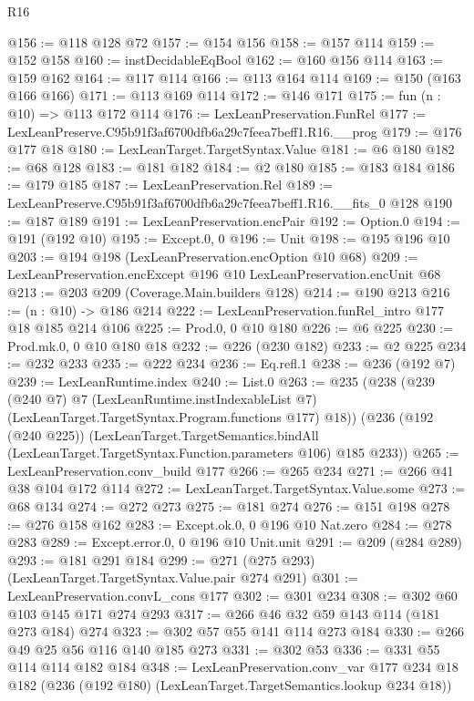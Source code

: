 \begin{lexlean}{R16}
\begin{coremodule}
@156 := @118 @128 @72
@157 := @154 @156
@158 := @157 @114
@159 := @152 @158
@160 := instDecidableEqBool
@162 := @160 @156 @114
@163 := @159 @162
@164 := @117 @114
@166 := @113 @164 @114
@169 := @150 (@163 @166 @166)
@171 := @113 @169 @114
@172 := @146 @171
@175 := fun (n : @10) => @113 @172 @114
@176 := LexLeanPreservation.FunRel
@177 := LexLeanPreserve.C95b91f3af6700dfb6a29c7feea7beff1.R16.__prog
@179 := @176 @177 @18
@180 := LexLeanTarget.TargetSyntax.Value
@181 := @6 @180
@182 := @68 @128
@183 := @181 @182
@184 := @2 @180
@185 := @183 @184
@186 := @179 @185
@187 := LexLeanPreservation.Rel
@189 := LexLeanPreserve.C95b91f3af6700dfb6a29c7feea7beff1.R16.__fits_0 @128
@190 := @187 @189
@191 := LexLeanPreservation.encPair
@192 := Option.{0}
@194 := @191 (@192 @10)
@195 := Except.{0, 0}
@196 := Unit
@198 := @195 @196 @10
@203 := @194 @198 (LexLeanPreservation.encOption @10 @68)
@209 := LexLeanPreservation.encExcept @196 @10 LexLeanPreservation.encUnit @68
@213 := @203 @209 (Coverage.Main.builders @128)
@214 := @190 @213
@216 := (n : @10) -> @186 @214
@222 := LexLeanPreservation.funRel_intro @177 @18 @185 @214 @106
@225 := Prod.{0, 0} @10 @180
@226 := @6 @225
@230 := Prod.mk.{0, 0} @10 @180 @18
@232 := @226 (@230 @182)
@233 := @2 @225
@234 := @232 @233
@235 := @222 @234
@236 := Eq.refl.{1}
@238 := @236 (@192 @7)
@239 := LexLeanRuntime.index
@240 := List.{0}
@263 := @235
    (@238
      (@239
        (@240 @7)
        @7
        (LexLeanRuntime.instIndexableList @7)
        (LexLeanTarget.TargetSyntax.Program.functions @177)
        @18))
    (@236
      (@192 (@240 @225))
      (LexLeanTarget.TargetSemantics.bindAll
        (LexLeanTarget.TargetSyntax.Function.parameters @106)
        @185
        @233))
@265 := LexLeanPreservation.conv_build @177
@266 := @265 @234
@271 := @266 @41 @38 @104 @172 @114
@272 := LexLeanTarget.TargetSyntax.Value.some
@273 := @68 @134
@274 := @272 @273
@275 := @181 @274
@276 := @151 @198
@278 := @276 @158 @162
@283 := Except.ok.{0, 0} @196 @10 Nat.zero
@284 := @278 @283
@289 := Except.error.{0, 0} @196 @10 Unit.unit
@291 := @209 (@284 @289)
@293 := @181 @291 @184
@299 := @271 (@275 @293) (LexLeanTarget.TargetSyntax.Value.pair @274 @291)
@301 := LexLeanPreservation.convL_cons @177
@302 := @301 @234
@308 := @302 @60 @103 @145 @171 @274 @293
@317 := @266 @46 @32 @59 @143 @114 (@181 @273 @184) @274
@323 := @302 @57 @55 @141 @114 @273 @184
@330 := @266 @49 @25 @56 @116 @140 @185 @273
@331 := @302 @53
@336 := @331 @55 @114 @114 @182 @184
@348 := LexLeanPreservation.conv_var
    @177
    @234
    @18
    @182
    (@236 (@192 @180) (LexLeanTarget.TargetSemantics.lookup @234 @18))

\end{coremodule}
\end{lexlean}
